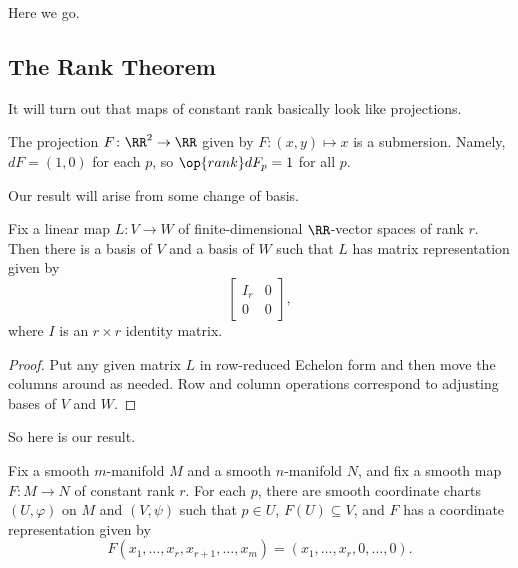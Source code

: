 \documentclass[../notes.tex]{subfiles}
\begin{document}
Here we go.

\subsection{The Rank Theorem}
It will turn out that maps of constant rank basically look like projections.
\begin{example}
	The projection $F\colon\RR^2\to\RR$ given by $F\colon(x,y)\mapsto x$ is a submersion. Namely, $dF=(1,0)$ for each $p$, so $\op{rank}dF_p=1$ for all $p$.
\end{example}
Our result will arise from some change of basis.
\begin{proposition} \label{prop:change-basis-to-rank}
	Fix a linear map $L\colon V\to W$ of finite-dimensional $\RR$-vector spaces of rank $r$. Then there is a basis of $V$ and a basis of $W$ such that $L$ has matrix representation given by
	\[\begin{bmatrix}
		I_r & 0 \\ 0 & 0
	\end{bmatrix},\]
	where $I$ is an $r\times r$ identity matrix.
\end{proposition}
\begin{proof}
	Put any given matrix $L$ in row-reduced Echelon form and then move the columns around as needed. Row and column operations correspond to adjusting bases of $V$ and $W$.
\end{proof}
So here is our result.
\begin{theorem} \label{thm:rank}
	Fix a smooth $m$-manifold $M$ and a smooth $n$-manifold $N$, and fix a smooth map $F\colon M\to N$ of constant rank $r$. For each $p$, there are smooth coordinate charts $(U,\varphi)$ on $M$ and $(V,\psi)$ such that $p\in U$, $F(U)\subseteq V$, and $F$ has a coordinate representation given by
	\[F(x_1,\ldots,x_r,x_{r+1},\ldots,x_m)=(x_1,\ldots,x_r,0,\ldots,0).\]
\end{theorem}
\end{document}
